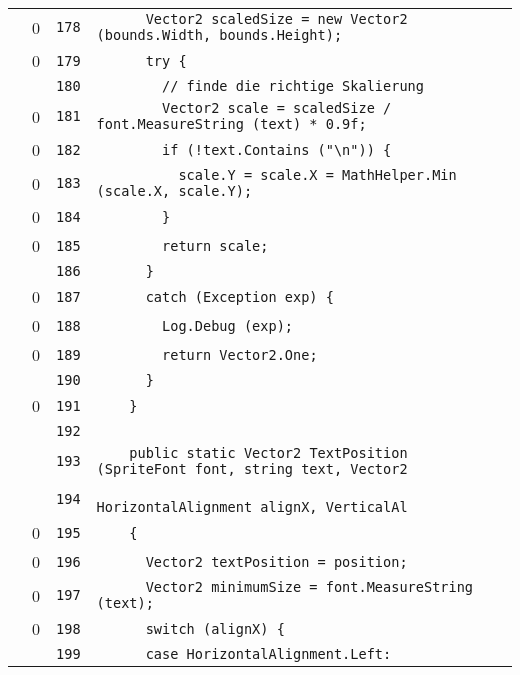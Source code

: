 \documentclass[a4paper,10pt]{article}
\begin{document}
\begin{longtable}[l]{lrrl}
\cellcolor{red} & 0 & \verb~178~ & \verb~      Vector2 scaledSize = new Vector2 (bounds.Width, bounds.Height);~\\
\cellcolor{red} & 0 & \verb~179~ & \verb~      try {~\\
\cellcolor{gray} &  & \verb~180~ & \verb~        // finde die richtige Skalierung~\\
\cellcolor{red} & 0 & \verb~181~ & \verb~        Vector2 scale = scaledSize / font.MeasureString (text) * 0.9f;~\\
\cellcolor{red} & 0 & \verb~182~ & \verb~        if (!text.Contains ("\n")) {~\\
\cellcolor{red} & 0 & \verb~183~ & \verb~          scale.Y = scale.X = MathHelper.Min (scale.X, scale.Y);~\\
\cellcolor{red} & 0 & \verb~184~ & \verb~        }~\\
\cellcolor{red} & 0 & \verb~185~ & \verb~        return scale;~\\
\cellcolor{gray} &  & \verb~186~ & \verb~      }~\\
\cellcolor{red} & 0 & \verb~187~ & \verb~      catch (Exception exp) {~\\
\cellcolor{red} & 0 & \verb~188~ & \verb~        Log.Debug (exp);~\\
\cellcolor{red} & 0 & \verb~189~ & \verb~        return Vector2.One;~\\
\cellcolor{gray} &  & \verb~190~ & \verb~      }~\\
\cellcolor{red} & 0 & \verb~191~ & \verb~    }~\\
\cellcolor{gray} &  & \verb~192~ & \verb~~\\
\cellcolor{gray} &  & \verb~193~ & \verb~    public static Vector2 TextPosition (SpriteFont font, string text, Vector2 ~\\
\cellcolor{gray} &  & \verb~194~ & \verb~                                        HorizontalAlignment alignX, VerticalAl~\\
\cellcolor{red} & 0 & \verb~195~ & \verb~    {~\\
\cellcolor{red} & 0 & \verb~196~ & \verb~      Vector2 textPosition = position;~\\
\cellcolor{red} & 0 & \verb~197~ & \verb~      Vector2 minimumSize = font.MeasureString (text);~\\
\cellcolor{red} & 0 & \verb~198~ & \verb~      switch (alignX) {~\\
\cellcolor{gray} &  & \verb~199~ & \verb~      case HorizontalAlignment.Left:~\\

\end{longtable}
\end{document}

